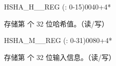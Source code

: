\begin{register}{H}{SHA\_H\_\_REG (: 0-15)}{\hexprefix{}0040+4*}\label{regdesc:SHAHNREG}
%
\regnewline%
\begin{regdesc}\begin{reglist}
\label{fielddesc:SHAH0}\item [SHA\_H\_\regindex{n}] 存储第  个 32 位哈希值。（读/写）
\end{reglist}\end{regdesc}
\end{register}


\begin{register}{H}{SHA\_M\_\_REG (: 0-31)}{\hexprefix{}0080+4*}\label{regdesc:SHAMNREG}
%
\begin{regdesc}\begin{reglist}
\label{fielddesc:SHAM0}\item [SHA\_M\_\regindex{n}] 存储第  个 32 位输入信息。（读/写）
\end{reglist}\end{regdesc}
\end{register}